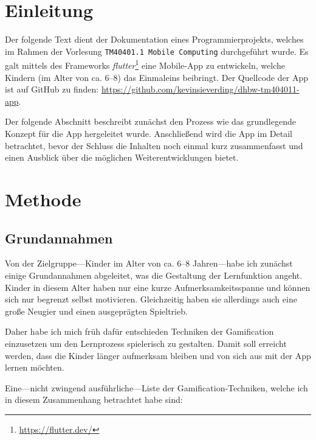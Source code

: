 
\section{Einleitung}\label{sec:introduction}

Der folgende Text dient der Dokumentation eines Programmierprojekts, welches im Rahmen der Vorlesung \texttt{TM40401.1 Mobile Computing} durchgeführt wurde.
Es galt mittels des Frameworks \emph{flutter}\footnote{\url{https://flutter.dev/}} eine Mobile-App zu entwickeln, welche Kindern (im Alter von ca. 6--8) das Einmaleins beibringt.
Der Quellcode der App ist auf GitHub zu finden: \url{https://github.com/kevinsieverding/dhbw-tm404011-app}.

Der folgende Abschnitt beschreibt zunächst den Prozess wie das grundlegende Konzept für die App hergeleitet wurde.
Anschließend wird die App im Detail betrachtet, bevor der Schluss die Inhalten noch einmal kurz zusammenfasst und einen Ausblick über die möglichen Weiterentwicklungen bietet.

\section{Methode}

\subsection{Grundannahmen}

Von der Zielgruppe---Kinder im Alter von ca. 6--8 Jahren---habe ich zunächst einige Grundannahmen abgeleitet, was die Gestaltung der Lernfunktion angeht.
Kinder in diesem Alter haben nur eine kurze Aufmerksamkeitsspanne und können sich nur begrenzt selbst motivieren. Gleichzeitig haben sie allerdings auch eine große Neugier und einen ausgeprägten Spieltrieb.

Daher habe ich mich früh dafür entschieden Techniken der Gamification einzusetzen um den Lernprozess spielerisch zu gestalten.
Damit soll erreicht werden, dass die Kinder länger aufmerksam bleiben und von sich aus mit der App lernen möchten.

Eine---nicht zwingend ausführliche---Liste der Gamification-Techniken, welche ich in diesem Zusammenhang betrachtet habe sind:

